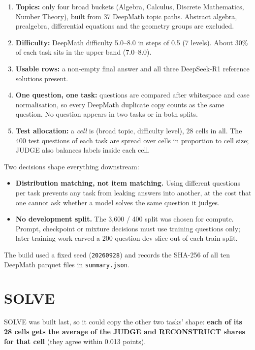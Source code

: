 \documentclass[11pt,a4paper]{article}
\newcommand{\code}[1]{\texttt{#1}}
\begin{document}
\begin{enumerate}
\item \textbf{Topics:} only four broad buckets (Algebra, Calculus, Discrete Mathematics, Number Theory), built from 37 DeepMath topic paths. Abstract algebra, prealgebra, differential equations and the geometry groups are excluded.
\item \textbf{Difficulty:} DeepMath difficulty 5.0--8.0 in steps of 0.5 (7 levels). About 30\% of each task sits in the upper band (7.0--8.0).
\item \textbf{Usable rows:} a non-empty final answer and all three DeepSeek-R1 reference solutions present.
\item \textbf{One question, one task:} questions are compared after whitespace and case normalisation, so every DeepMath duplicate copy counts as the same question. No question appears in two tasks or in both splits.
\item \textbf{Test allocation:} a \emph{cell} is (broad topic, difficulty level), 28 cells in all. The 400 test questions of each task are spread over cells in proportion to cell size; JUDGE also balances labels inside each cell.
\end{enumerate}

Two decisions shape everything downstream:
\begin{itemize}
\item \textbf{Distribution matching, not item matching.} Using different questions per task prevents any task from leaking answers into another, at the cost that one cannot ask whether a model solves the same question it judges.
\item \textbf{No development split.} The 3,600 / 400 split was chosen for compute. Prompt, checkpoint or mixture decisions must use training questions only; later training work carved a 200-question dev slice out of each train split.
\end{itemize}
The build used a fixed seed (\code{20260928}) and records the SHA-256 of all ten DeepMath parquet files in \code{summary.json}.

\section{SOLVE}

SOLVE was built last, so it could copy the other two tasks' shape: \textbf{each of its 28 cells gets the average of the JUDGE and RECONSTRUCT shares for that cell} (they agree within 0.013 points).
\end{document}
